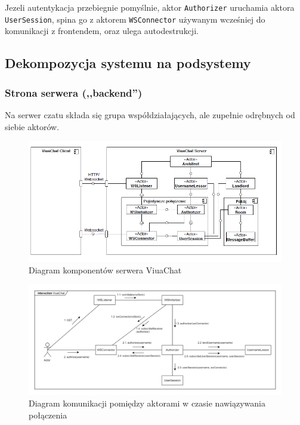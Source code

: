 Jezeli autentykacja przebiegnie pomyślnie, aktor \texttt{Authorizer} uruchamia
aktora \texttt{UserSession}, spina go z aktorem \texttt{WSConnector} używanym
wcześniej do komunikacji z frontendem, oraz ulega autodestrukcji.

\newpage

\subsection{Dekompozycja systemu na podsystemy}
\label{architektura_chatu}

\subsubsection{Strona serwera (,,backend'')}
Na serwer czatu składa się grupa współdziałających, ale zupełnie odrębnych od siebie aktorów.

\begin{figure}[!htp]
	\centering
	\includegraphics[width=\textwidth]{chat/fig/pck-diag}
	\caption{Diagram komponentów serwera ViuaChat}
	\label{diag-komp}
\end{figure}

\begin{figure}[!htp]
	\centering
	\includegraphics[width=\textwidth]{chat/fig/com-diag-init}
	\caption{Diagram komunikacji pomiędzy aktorami w czasie nawiązywania połączenia}
	\label{com-diag-init}
\end{figure}

